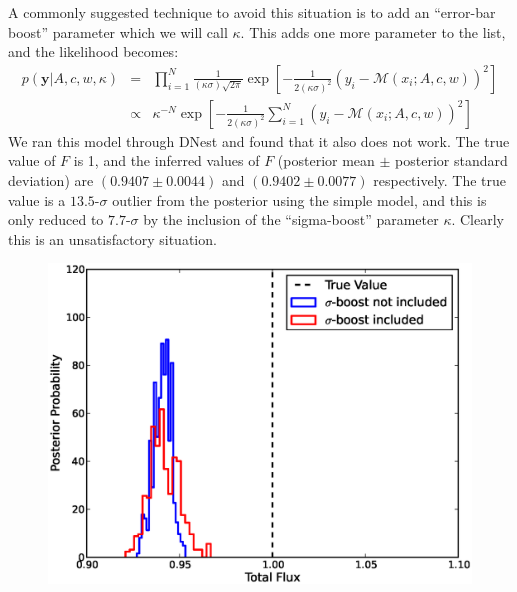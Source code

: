 \documentclass[letterpaper, 11pt]{article}
\newcommand{\yy}{\mathbf{y}}
\begin{document}
A commonly suggested technique \citep[e.g.][]{gregory} to avoid this situation
is to add an ``error-bar boost'' parameter which we will call $\kappa$.
This adds one more parameter to the list, and the likelihood becomes:
\begin{eqnarray}
p(\yy|A, c, w, \kappa) &=& \prod_{i=1}^N
\frac{1}{(\kappa\sigma)\sqrt{2\pi}}
\exp
\left[
-\frac{1}{2(\kappa\sigma)^2}\left(y_i - \mathcal{M}(x_i; A, c, w)\right)^2
\right] \\
&\propto& \kappa^{-N}\exp\left[-\frac{1}{2(\kappa\sigma)^2}\sum_{i=1}^N\left(y_i - \mathcal{M}(x_i; A, c, w)\right)^2\right]
\end{eqnarray}
We ran this model through DNest and found that it also does not work. The
true value of $F$ is 1, and the inferred values of $F$ (posterior mean
$\pm$ posterior standard deviation) are
$(0.9407 \pm 0.0044)$ and $(0.9402 \pm 0.0077)$
respectively. The true value is a $13.5$-$\sigma$ outlier from the posterior
using the simple model, and this is only reduced to $7.7$-$\sigma$ by the
inclusion of the ``sigma-boost'' parameter $\kappa$. Clearly this is an
unsatisfactory situation.

\begin{figure}
\begin{center}
\includegraphics[scale=0.5]{failure.eps}
\caption{\label{failure}}
\end{center}
\end{figure}
\end{document}
